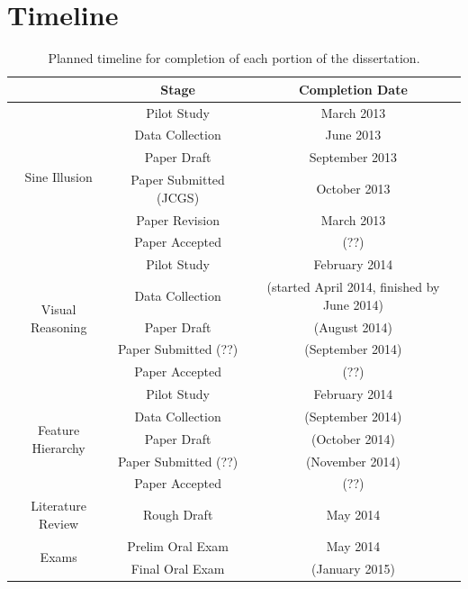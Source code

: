 \documentclass[11pt]{isuthesis}\usepackage[]{graphicx}\usepackage[]{color}
\begin{document}
\section{Timeline}
\begin{table}[htbp]\centering
\begin{tabular}{|c|c|c|}\hline
 & Stage & Completion Date\\\hline
\multirow{6}{*}{Sine Illusion} & Pilot Study & March 2013\\
 & Data Collection & June 2013\\
 & Paper Draft & September 2013\\
 & Paper Submitted (JCGS) & October 2013\\
 & Paper Revision & March 2013\\
 & Paper Accepted & (??)\\\hline
\multirow{5}{*}{Visual Reasoning} & Pilot Study & February 2014\\
 & Data Collection & (started April 2014, finished by June 2014)\\
 & Paper Draft & (August 2014)\\
 & Paper Submitted (??) & (September 2014)\\
 & Paper Accepted & (??) \\\hline
\multirow{5}{*}{Feature Hierarchy} & Pilot Study & February 2014\\
 & Data Collection & (September 2014)\\
 & Paper Draft & (October 2014)\\
 & Paper Submitted (??) & (November 2014)\\
 & Paper Accepted & (??) \\\hline
Literature Review & Rough Draft & May 2014\\\hline
\multirow{2}{*}{Exams} & Prelim Oral Exam & May 2014 \\
 & Final Oral Exam & (January 2015)\\\hline
\end{tabular}
\caption{Planned timeline for completion of each portion of the dissertation.}
\end{table}
\end{document}
